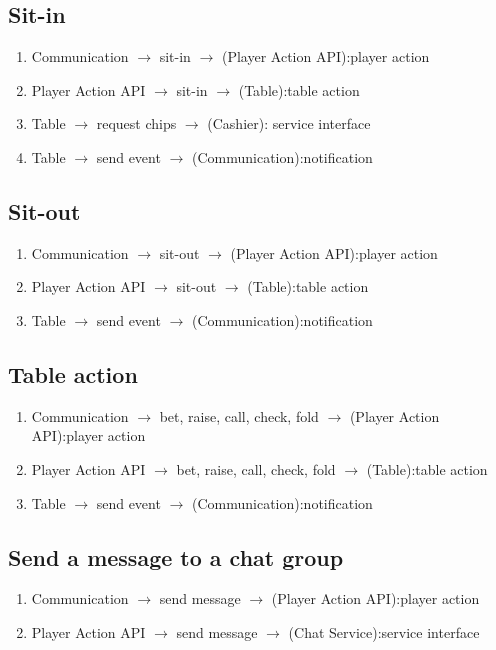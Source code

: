 \documentclass[a4paper,11pt]{report}
\begin{document}
\subsection{Sit-in}
\begin{enumerate}
\item Communication $\rightarrow$ sit-in $\rightarrow$ (Player Action API):player action
\item Player Action API $\rightarrow$ sit-in $\rightarrow$ (Table):table action
\item Table $\rightarrow$ request chips $\rightarrow$ (Cashier): service interface
\item Table $\rightarrow$ send event $\rightarrow$ (Communication):notification
\end{enumerate}

\subsection{Sit-out}
\begin{enumerate}
\item Communication $\rightarrow$ sit-out $\rightarrow$ (Player Action API):player action
\item Player Action API $\rightarrow$ sit-out $\rightarrow$ (Table):table action
\item Table $\rightarrow$ send event $\rightarrow$ (Communication):notification
\end{enumerate}

\subsection{Table action}
\begin{enumerate}
\item Communication $\rightarrow$ bet, raise, call, check, fold $\rightarrow$ (Player Action API):player action
\item Player Action API $\rightarrow$ bet, raise, call, check, fold $\rightarrow$ (Table):table action
\item Table $\rightarrow$ send event $\rightarrow$ (Communication):notification
\end{enumerate}

\subsection{Send a message to a chat group}
\begin{enumerate}
\item Communication $\rightarrow$ send message $\rightarrow$ (Player Action API):player action
\item Player Action API $\rightarrow$ send message $\rightarrow$ (Chat Service):service interface
\end{enumerate}
\end{document}
